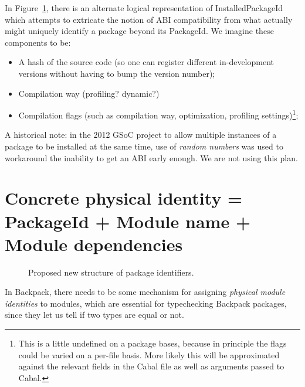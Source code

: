 \documentclass{article}
\begin{document}
In Figure~\ref{fig:proposed-pkgid}, there is an alternate logical
representation of InstalledPackageId which attempts to extricate the
notion of ABI compatibility from what actually might uniquely identify a
package beyond its PackageId.  We imagine these components to be:

\begin{itemize}
    \item A hash of the source code (so one can register different
        in-development versions without having to bump the version
        number);
    \item Compilation way (profiling? dynamic?)
    \item Compilation flags (such as compilation way, optimization,
        profiling settings)\footnote{This is a little undefined on a package bases, because in principle the flags could be varied on a per-file basis. More likely this will be approximated against the relevant fields in the Cabal file as well as arguments passed to Cabal.};
\end{itemize}

A historical note: in the 2012 GSoC project to allow multiple instances
of a package to be installed at the same time, use of \emph{random
numbers} was used to workaround the inability to get an ABI early
enough.  We are not using this plan.

\section{Concrete physical identity = PackageId + Module name + Module dependencies}\label{sec:ipi}

\begin{figure}
\label{fig:proposed-pkgid}\caption{Proposed new structure of package identifiers.}
\end{figure}

In Backpack, there needs to be some mechanism for assigning
\emph{physical module identities} to modules, which are essential for
typechecking Backpack packages, since they let us tell if two types are
equal or not.
\end{document}
